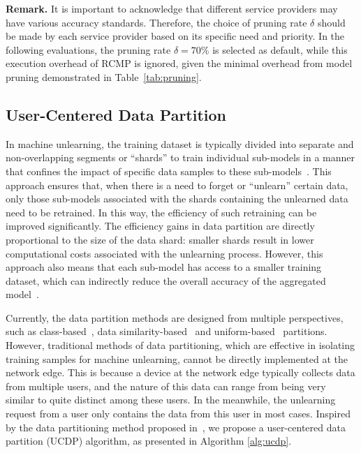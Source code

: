 \documentclass[conference,compsoc]{IEEEtran}
\begin{document}
\smallskip
\noindent\textbf{Remark.} It is important to acknowledge that different service providers may have various accuracy standards. Therefore, the choice of pruning rate $\delta$ should be made by each service provider based on its specific need and priority. In the following evaluations, the pruning rate $\delta = 70\%$ is selected as default, while this execution overhead of RCMP is ignored, given the minimal overhead from model pruning demonstrated in Table~\ref{tab:pruning}.


\subsection{User-Centered Data Partition}
\label{subsec:data_partition}

In machine unlearning, the training dataset is typically divided into separate and non-overlapping segments or ``shards'' to train individual sub-models in a manner that confines the impact of specific data samples to these sub-models~\cite{bourtoule2021machine, chen2022recommendation, yan2022arcane}. This approach ensures that, when there is a need to forget or ``unlearn'' certain data, only those sub-models associated with the shards containing the unlearned data need to be retrained. In this way, the efficiency of such retraining can be improved significantly. 
The efficiency gains in data partition are directly proportional to the size of the data shard: smaller shards result in lower computational costs associated with the unlearning process. 
However, this approach also means that each sub-model has access to a smaller training dataset, which can indirectly reduce the overall accuracy of the aggregated model~\cite{xu2024machine}.


Currently, the data partition methods are designed from multiple perspectives, such as class-based~\cite{yan2022arcane}, data similarity-based~\cite{chen2022recommendation, qian2022patient} and uniform-based~\cite{bourtoule2021machine} partitions.
However, traditional methods of data partitioning, which are effective in isolating training samples for machine unlearning, cannot be directly implemented at the network edge. This is because a device at the network edge typically collects data from multiple users, and the nature of this data can range from being very similar to quite distinct among these users. In the meanwhile, the unlearning request from a user only contains the data from this user in most cases. Inspired by the data partitioning method proposed in~\cite{chen2022recommendation}, we propose a user-centered data partition (UCDP) algorithm, as presented in Algorithm \ref{alg:ucdp}. 
\end{document}

